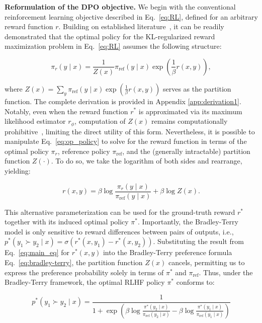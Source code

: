 \textbf{Reformulation of the DPO objective.} We begin with the conventional reinforcement learning objective described in Eq.~\ref{eq:RL}, defined for an arbitrary reward function $r$. Building on established literature~\citep{peters2007reinforcement, peng2019advantage, korbak2022reinforcement, go2023aligning}, it can be readily demonstrated that the optimal policy for the KL-regularized reward maximization problem in Eq.~\ref{eq:RL} assumes the following structure:

\begin{equation}\label{eq:op_policy}
    \pi_r(y\mid x) = \frac{1}{Z(x)}\pi_\text{ref}(y\mid x)\exp\left(\frac{1}{\beta}r(x, y)\right),
\end{equation}

where $Z(x) =\sum_{y}\pi_\text{ref}(y\mid x)\exp\left(\frac{1}{\beta}r(x, y)\right)$ serves as the partition function. The complete derivation is provided in Appendix \ref{app:derivation1}. Notably, even when the reward function $r^*$ is approximated via its maximum likelihood estimator $r_{\phi}$, computation of $Z(x)$ remains computationally prohibitive~\citep{korbak2022reinforcement, go2023aligning}, limiting the direct utility of this form. Nevertheless, it is possible to manipulate Eq.~\ref{eq:op_policy} to solve for the reward function in terms of the optimal policy $\pi_r$, reference policy $\pi_\text{ref}$, and the (generally intractable) partition function $Z(\cdot)$. To do so, we take the logarithm of both sides and rearrange, yielding:

\begin{equation}\label{eq:main_eq}
    r(x,y) =\beta \log \frac{\pi_r(y\mid x)}{\pi_\text{ref}(y\mid x)} + \beta \log Z(x).
\end{equation}

This alternative parameterization can be used for the ground-truth reward $r^*$ together with its induced optimal policy $\pi^*$. Importantly, the Bradley-Terry model is only sensitive to reward differences between pairs of outputs, i.e., ${p^*(y_1 \succ y_2 \mid x) = \sigma(r^*(x, y_1) - r^*(x, y_2))}$. Substituting the result from Eq.~\ref{eq:main_eq} for $r^*(x,y)$ into the Bradley-Terry preference formula Eq.~\ref{eq:bradley-terry}, the partition function $Z(x)$ cancels, permitting us to express the preference probability solely in terms of $\pi^*$ and $\pi_\text{ref}$. Thus, under the Bradley-Terry framework, the optimal RLHF policy $\pi^*$ conforms to:

\begin{equation}\label{eq:objective}
    p^*(y_1\succ y_2 \mid x)=\frac{1}{1 + \exp\left(\beta \log \frac{\pi^*(y_2\mid x)}{\pi_\text{ref}(y_2\mid x)} - \beta \log \frac{\pi^*(y_1\mid x)}{\pi_\text{ref}(y_1\mid x)}\right)}
\end{equation}

